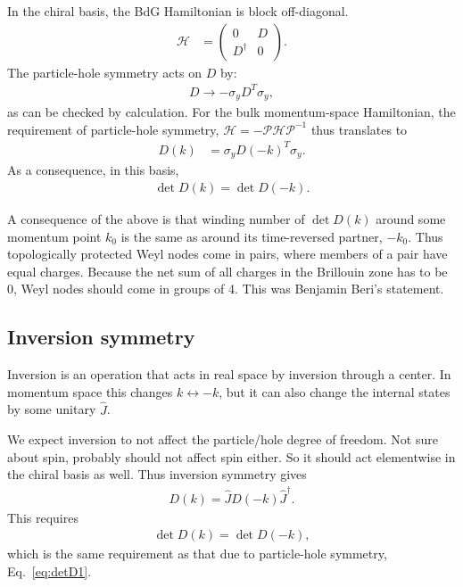 \documentclass[aps,prb,twocolumn,showpacs,superscriptaddress,10p,longbibliography]{revtex4-1}
\newcommand{\Hbdg}{\mathcal{H}}
\begin{document}
In the chiral basis, the BdG Hamiltonian is block off-diagonal.
\begin{align}
  \Hbdg &= \begin{pmatrix} 0 & D \\ D^\dagger & 0 \end{pmatrix}.
\end{align}
The particle-hole symmetry acts on $D$ by:
\begin{align}
  D \to -\sigma_y D^T \sigma_y,
\end{align}
as can be checked by calculation. 
For the bulk momentum-space Hamiltonian, the requirement of particle-hole
symmetry, $\Hbdg = - \mathcal{P}\Hbdg\mathcal{P}^{-1}$ thus translates to
\begin{align}
  D(k) &= \sigma_y D(-k)^T \sigma_y.
\end{align}
As a consequence, in this basis,
\begin{align}
 \label{eq:detD1}
  \det D(k) = \det D(-k).
\end{align}

A consequence of the above is that winding number of $\det D(k)$
around some momentum point $k_0$ is the same as around its
time-reversed partner, $-k_0$. Thus topologically protected Weyl nodes
come in pairs, where members of a pair have equal charges. Because the
net sum of all charges in the Brillouin zone has to be 0, Weyl nodes
should come in groups of 4. This was Benjamin Beri's statement.

\subsection{Inversion symmetry}

Inversion is an operation that acts in real space by inversion through
a center. In momentum space this changes $k \leftrightarrow -k$, but
it can also change the internal states by some unitary $\hat J$.

We expect inversion to not affect the particle/hole degree of
freedom. Not sure about spin, probably should not affect spin
either. So it should act elementwise in the chiral basis as
well. Thus inversion symmetry gives
\begin{align}
  D(k) = \hat{J} D(-k) \hat{J}^\dagger.
\end{align}
This requires
\begin{align}
  \det D(k) = \det D(-k),
\end{align}
which is the same requirement as that due to particle-hole symmetry,
Eq.~\eqref{eq:detD1}.
\end{document}
